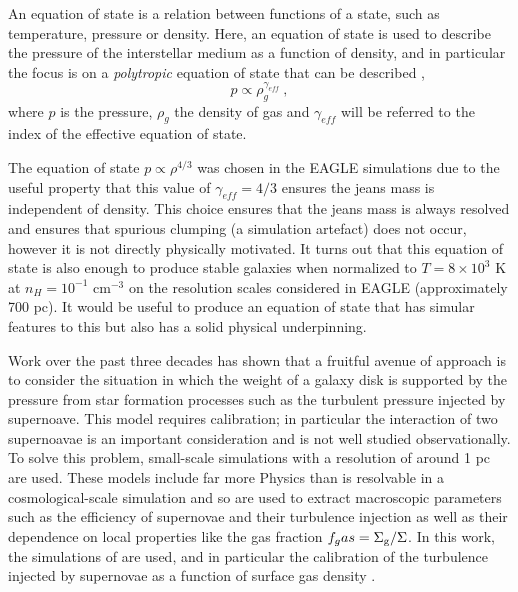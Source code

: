 An equation of state is a relation between functions of a state, such as temperature, pressure or density. 
Here, an equation of state is used to describe the pressure of the interstellar medium as a function of density, and in particular the focus is on a \emph{polytropic} equation of state that can be described \citep{horedt_polytropes:_2004},
\begin{equation}
\label{eqn:polytrope}
p \propto \rho_g ^ {\gamma_{eff}}~,
\end{equation}
where $p$ is the pressure, $\rho_g$ the density of gas and $\gamma_{eff}$ will be referred to the index of the effective equation of state.

The equation of state $p \propto \rho^{4/3}$ was chosen in the EAGLE simulations \citep{schaye_eagle_2015} due to the useful property that this value of $\gamma_{eff} = 4/3$ ensures the jeans mass is independent of density.
This choice ensures that the jeans mass is always resolved and ensures that spurious clumping (a simulation artefact) does not occur, however it is not directly physically motivated.
It turns out that this equation of state is also enough to produce stable galaxies when normalized to $T = 8\times 10^3$ K at $n_H = 10^{-1}$ cm$^{-3}$ on the resolution scales considered in EAGLE (approximately 700 pc).
It would be useful to produce an equation of state that has simular features to this but also has a solid physical underpinning.

Work over the past three decades has shown that a fruitful avenue of approach is to consider the situation in which the weight of a galaxy disk is supported by the pressure from star formation processes such as the turbulent pressure injected by supernoave. 
This model requires calibration; in particular the interaction of two supernoavae is an important consideration and is not well studied observationally.
To solve this problem, small-scale simulations with a resolution of around 1 pc \citep{martizzi_supernova_2015} are used.
These models include far more Physics than is resolvable in a cosmological-scale simulation and so are used to extract macroscopic parameters such as the efficiency of supernovae and their turbulence injection as well as their dependence on local properties like the gas fraction $f_gas = \Sigma_\mathrm{g}/\Sigma$.
In this work, the simulations of \citet{martizzi_supernova_2015} are used, and in particular the calibration of the turbulence injected by supernovae as a function of surface gas density \citep{martizz_supernova_2016}.
